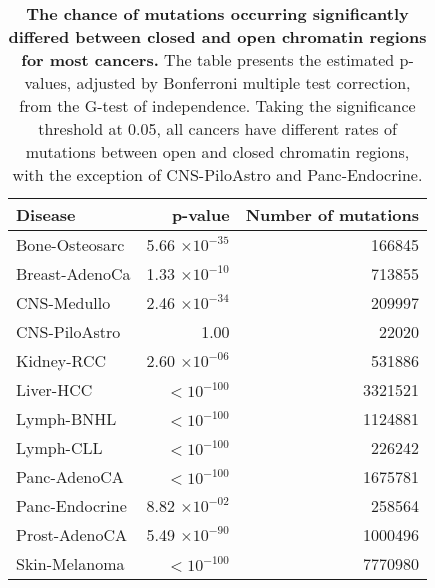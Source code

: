 \begin{table}[h]
\centering
\caption{\textbf{The chance of mutations occurring significantly differed between closed and open chromatin regions for most cancers.} The table presents the estimated p-values, adjusted by Bonferroni multiple test correction, from the G-test of independence. Taking the significance threshold at 0.05, all cancers have different rates of mutations between open and closed chromatin regions, with the exception of CNS-PiloAstro and Panc-Endocrine.}
\label{tab:g-test}
\begin{tabular}{lrr}
  \toprule
 \textbf{Disease} & \textbf{p-value} & \textbf{Number of mutations} \\ 
  \hline
 Bone-Osteosarc & 5.66 $\times 10^{-35}$ & 166845 \\ 
 Breast-AdenoCa & 1.33 $\times 10^{-10}$ & 713855 \\ 
 CNS-Medullo & 2.46 $\times 10^{-34}$ & 209997 \\ 
 CNS-PiloAstro & 1.00 & 22020 \\ 
 Kidney-RCC & 2.60 $\times 10^{-06}$ & 531886 \\ 
 Liver-HCC & $<10^{-100}$ & 3321521 \\ 
 Lymph-BNHL & $<10^{-100}$ & 1124881 \\ 
 Lymph-CLL & $<10^{-100}$ & 226242 \\ 
 Panc-AdenoCA & $<10^{-100}$ & 1675781 \\ 
 Panc-Endocrine & 8.82 $\times 10^{-02}$ & 258564 \\ 
 Prost-AdenoCA & 5.49 $\times 10^{-90}$ & 1000496 \\ 
 Skin-Melanoma & $<10^{-100}$ & 7770980 \\ 
   \bottomrule
\end{tabular}
\end{table}